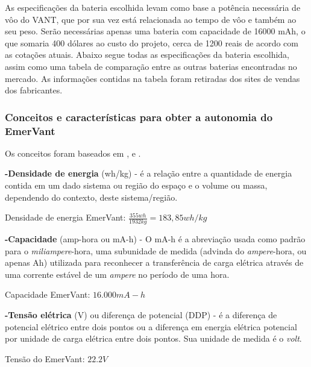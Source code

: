 As especificações da bateria escolhida levam como base a potência necessária de vôo do VANT, que por sua vez está relacionada ao tempo de vôo e também ao seu peso.  Serão necessárias apenas uma bateria com capacidade de 16000 mAh, o que somaria 400 dólares ao custo do projeto, cerca de 1200 reais de acordo com as cotações atuais. Abaixo segue todas as especificações da bateria escolhida, assim como uma tabela de comparação entre as outras baterias encontradas no mercado. 
As informações contidas na tabela foram retiradas dos sites de vendas dos fabricantes.

\nocite{bateria1}
\nocite{bateria2}
\nocite{bateria3}
\nocite{bateria4}
\nocite{bateria5}
\nocite{bateria6}
\nocite{bateria7}
\nocite{bateria8}
\nocite{bateria9}
\nocite{bateria10}


\subsubsection{Conceitos e características para obter a autonomia do EmerVant}

Os conceitos foram baseados em \cite{charlesa}, \cite{charlesb} e \cite{gibbs}.

\textbf{-Densidade de energia} (wh/kg) - é a relação entre a quantidade de energia contida em um dado sistema ou região do espaço e o volume ou massa, dependendo do contexto, deste sistema/região.

	Densidade de energia EmerVant: $\frac{355wh}{1932kg} =  183,85 wh/kg$

\textbf{-Capacidade} (amp-hora ou mA-h) -  O mA-h é a abreviação usada como padrão para o \textit{miliampere}-hora, uma subunidade de medida (advinda do \textit{ampere}-hora, ou apenas Ah) utilizada para reconhecer a transferência de carga elétrica através de uma corrente estável de um \textit{ampere} no período de uma hora.

	Capacidade EmerVant: $16.000mA-h$

\textbf{-Tensão elétrica} (V) ou diferença de potencial (DDP) - é a diferença de potencial elétrico entre dois pontos ou a diferença em energia elétrica potencial por unidade de carga elétrica entre dois pontos. Sua unidade de medida é o \textit{volt}.
	
	Tensão do EmerVant: $22.2 V$


